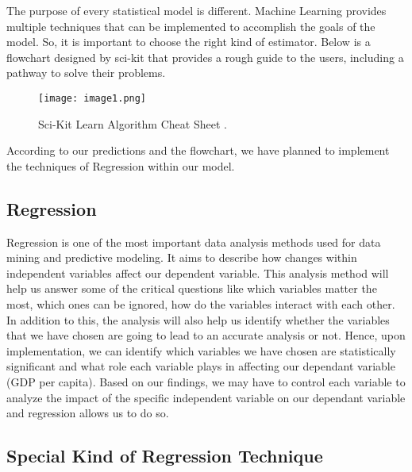 \hspace{20pt}The purpose of every statistical model is different. Machine Learning provides multiple techniques that can be implemented to accomplish the goals of the model. So, it is important to choose the right kind of estimator. Below is a flowchart designed by sci-kit that provides a rough guide to the users, including a pathway to solve their problems.

\begin{figure}[htpb]
\centering
\texttt{[image: image1.png]}
\caption{
        Sci-Kit Learn Algorithm Cheat Sheet \cite{scikit-learn}. 
    }
    \label{fig:basics AFM sketch}
\end{figure}

According to our predictions and the flowchart, we have planned to implement the techniques of Regression within our model.

\subsection{Regression}

\hspace{20pt}Regression is one of the most important data analysis methods used for data mining and predictive modeling. It aims to describe how changes within independent variables affect our dependent variable. This analysis method will help us answer some of the critical questions like which variables matter the most, which ones can be ignored, how do the variables interact with each other. In addition to this, the analysis will also help us identify whether the variables that we have chosen are going to lead to an accurate analysis or not. Hence, upon implementation, we can identify which variables we have chosen are statistically significant and what role each variable plays in affecting our dependant variable (GDP per capita). Based on our findings, we may have to control each variable to analyze the impact of the specific independent variable on our dependant variable and regression allows us to do so.

\subsection{Special Kind of Regression Technique}

